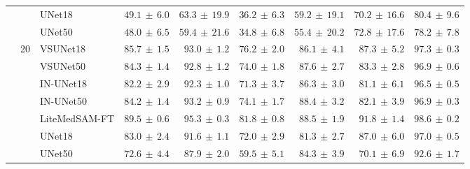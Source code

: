 \documentclass[%
reprint,
nofootinbib,
 amsmath,amssymb,
aps,
superscriptaddress,
showkeys,
longbibliography
]{revtex4-1}
\begin{document}
\begin{table}[t]
\begin{tabular}{l c l r r r r r r}
 &  & UNet18 & $49.1 \,\pm\, 6.0$ & $63.3 \,\pm\, 19.9$ & $36.2 \,\pm\, 6.3$ & $59.2 \,\pm\, 19.1$ & $70.2 \,\pm\, 16.6$ & $80.4 \,\pm\, 9.6$ \\
 &  & UNet50 & $48.0 \,\pm\, 6.5$ & $59.4 \,\pm\, 21.6$ & $34.8 \,\pm\, 6.8$ & $55.4 \,\pm\, 20.2$ & $72.8 \,\pm\, 17.6$ & $78.2 \,\pm\, 7.8$ \\
\cline{2-9}
 & \multirow{7}{*}{20} & VSUNet18 & $85.7 \,\pm\, 1.5$ & $93.0 \,\pm\, 1.2$ & $76.2 \,\pm\, 2.0$ & $86.1 \,\pm\, 4.1$ & $87.3 \,\pm\, 5.2$ & $97.3 \,\pm\, 0.3$ \\
 &  & VSUNet50 & $84.3 \,\pm\, 1.4$ & $92.8 \,\pm\, 1.2$ & $74.0 \,\pm\, 1.8$ & $87.6 \,\pm\, 2.7$ & $83.3 \,\pm\, 2.8$ & $96.9 \,\pm\, 0.6$ \\
 &  & IN-UNet18 & $82.2 \,\pm\, 2.9$ & $92.3 \,\pm\, 1.0$ & $71.3 \,\pm\, 3.7$ & $86.3 \,\pm\, 3.0$ & $81.1 \,\pm\, 6.1$ & $96.5 \,\pm\, 0.5$ \\
 &  & IN-UNet50 & $84.2 \,\pm\, 1.4$ & $93.2 \,\pm\, 0.9$ & $74.1 \,\pm\, 1.7$ & $88.4 \,\pm\, 3.2$ & $82.1 \,\pm\, 3.9$ & $96.9 \,\pm\, 0.3$ \\
 &  & LiteMedSAM-FT & $\mathbf{89.5} \,\pm\, 0.6$ & $95.3 \,\pm\, 0.3$ & $81.8 \,\pm\, 0.8$ & $88.5 \,\pm\, 1.9$ & $91.8 \,\pm\, 1.4$ & $98.6 \,\pm\, 0.2$ \\
 &  & UNet18 & $83.0 \,\pm\, 2.4$ & $91.6 \,\pm\, 1.1$ & $72.0 \,\pm\, 2.9$ & $81.3 \,\pm\, 2.7$ & $87.0 \,\pm\, 6.0$ & $97.0 \,\pm\, 0.5$ \\
 &  & UNet50 & $72.6 \,\pm\, 4.4$ & $87.9 \,\pm\, 2.0$ & $59.5 \,\pm\, 5.1$ & $84.3 \,\pm\, 3.9$ & $70.1 \,\pm\, 6.9$ & $92.6 \,\pm\, 1.7$ \\
\hline
\end{tabular}
    \endgroup
\end{table}
\end{document}

